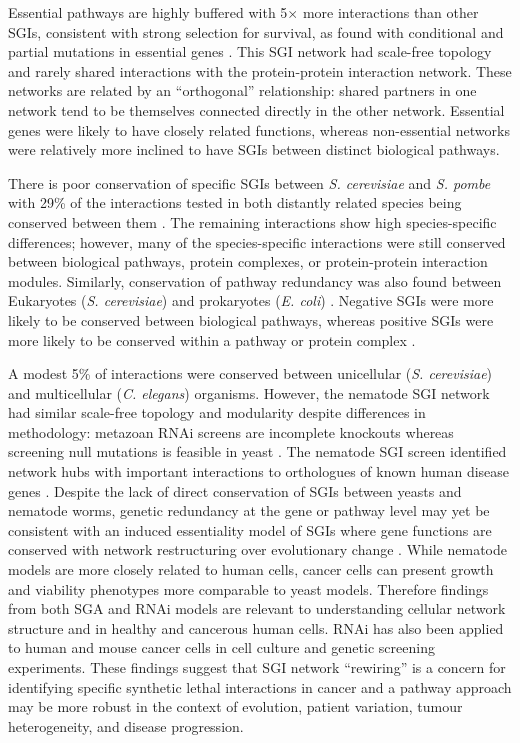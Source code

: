 Essential pathways are highly buffered with 5$\times$ more interactions than other \glspl{SGI}, consistent with strong selection for survival, as found with conditional and partial mutations in essential genes \citep{Davierwala2005}. This \gls{SGI} network had scale-free topology and rarely shared interactions with the protein-protein interaction network. These networks are related by an ``orthogonal'' relationship: shared partners in one network tend to be themselves connected directly in the other network. Essential genes were likely to have closely related functions, whereas non-essential networks were relatively more inclined to have \glspl{SGI} between distinct biological pathways. 

There is poor conservation of specific \glspl{SGI} between \textit{S. cerevisiae} and \textit{S. pombe} with 29\% of the interactions tested in both distantly related species being conserved between them \citep{Dixon2008}. The remaining interactions show high species-specific differences; however, many of the species-specific interactions were still conserved between biological pathways, protein complexes, or protein-protein interaction modules. Similarly, conservation of pathway redundancy was also found between  Eukaryotes (\textit{S. cerevisiae}) and prokaryotes (\textit{E. coli}) \citep{Butland2008}. Negative \glspl{SGI} were more likely to be conserved between biological pathways, whereas positive \glspl{SGI} were more likely to be conserved within a pathway or protein complex \citep{Roguev2008}. 

A modest 5\% of interactions were conserved between unicellular (\textit{S. cerevisiae}) and multicellular (\textit{C. elegans}) organisms. However, the nematode \gls{SGI} network had similar scale-free topology and modularity despite differences in methodology: metazoan \gls{RNAi} screens are incomplete knockouts whereas screening null mutations is feasible in yeast \citep{Bussey2006}. The nematode \gls{SGI} screen identified network hubs with important interactions to orthologues of known human disease genes \citep{Lehner2006}. Despite the lack of direct conservation of \glspl{SGI} between yeasts and nematode worms, genetic redundancy at the gene or pathway level may yet be consistent with an induced essentiality model of \glspl{SGI} where gene functions are conserved with network restructuring over evolutionary change \citep{Tischler2008}. While nematode models are more closely related to human cells, cancer cells can present growth and viability phenotypes more comparable to yeast models. Therefore findings from both SGA and \gls{RNAi} models are relevant to understanding cellular network structure and in healthy and cancerous human cells. \gls{RNAi} has also been applied to human and mouse cancer cells in cell culture and genetic screening experiments. These findings suggest that \gls{SGI} network ``rewiring'' is a concern for identifying specific \gls{synthetic lethal} interactions in cancer and a pathway approach may be more robust in the context of evolution, patient variation, tumour heterogeneity, and disease progression.  

